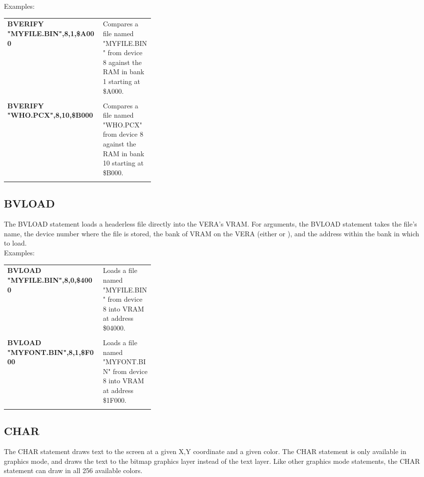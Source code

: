 Examples:\\

\begin{tabular}{l p{0.35\linewidth}}

	{\ttfamily\bfseries BVERIFY "MYFILE.BIN",8,1,\$A000}&Compares a file named
	"MYFILE.BIN" from device 8 against the RAM in bank 1 starting at
	\$A000.\\\\

	{\ttfamily\bfseries BVERIFY "WHO.PCX",8,10,\$B000}&Compares a file named
	"WHO.PCX" from device 8 against the RAM in bank 10 starting at \$B000.\\\\

\end{tabular}

\subsection{BVLOAD}

The {\ttfamily BVLOAD} statement loads a headerless file directly into the
VERA's VRAM.  For arguments, the {\ttfamily BVLOAD} statement takes the file's
name, the device number where the file is stored, the bank of VRAM on the VERA
(either {} or {}), and the address within the bank in
which to load.\\

Examples:\\

\begin{tabular}{l p{0.35\linewidth}}

	{\ttfamily\bfseries BVLOAD "MYFILE.BIN",8,0,\$4000}&Loads a file named
	"MYFILE.BIN" from device 8 into VRAM at address \$04000.\\\\

	{\ttfamily\bfseries BVLOAD "MYFONT.BIN",8,1,\$F000}&Loads a file named
	"MYFONT.BIN" from device 8 into VRAM at address \$1F000.\\\\

\end{tabular}

\subsection{CHAR}

The {\ttfamily CHAR} statement draws text to the screen at a given X,Y
coordinate and a given color.  The {\ttfamily CHAR} statement is only available
in graphics mode, and draws the text to the bitmap graphics layer instead of
the text layer.  Like other graphics mode statements, the {\ttfamily CHAR}
statement can draw in all 256 available colors.\\

